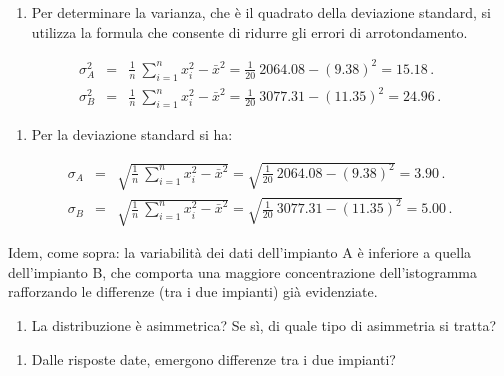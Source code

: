 \documentclass[
  11pt,
]{book}
\providecommand{\tightlist}{%
  \setlength{\itemsep}{0pt}\setlength{\parskip}{0pt}}
\theoremstyle{mytheoremstyle}
\theoremstyle{mydefstyle}
\newenvironment{sol}
  {
  \begin{tcolorbox}[enhanced,breakable,arc=0.1mm,boxrule=1pt,colback=white,colframe=iblue,
  title=\bf \fontfamily{lmss}\selectfont \hspace{.5 cm} Soluzione,drop fuzzy shadow]

}{
\end{tcolorbox}
  }
\begin{document}
\begin{sol}

\begin{enumerate}
\def\labelenumi{\alph{enumi}.}
\setcounter{enumi}{6}
\tightlist
\item
  Per determinare la varianza, che è il quadrato della deviazione
  standard, si utilizza la formula che consente di ridurre gli errori
  di arrotondamento.
\end{enumerate}

\begin{eqnarray*}
\sigma_{A}^{2} &=& \frac{1} {n}\ \sum_{i=1}^{n} x_{i}^{2} - \bar{x}^{2}
                =  \frac{1} {20}\ 2064.08 - (9.38)^{2} = 15.18 \,. \\
\sigma_{B}^{2} &=& \frac{1} {n}\ \sum_{i=1}^{n} x_{i}^{2} - \bar{x}^{2}
                =  \frac{1} {20}\ 3077.31 - (11.35)^{2} = 24.96 \,.
\end{eqnarray*}

\begin{enumerate}
\def\labelenumi{\alph{enumi}.}
\setcounter{enumi}{7}
\tightlist
\item
  Per la deviazione standard si ha:
\end{enumerate}

\begin{eqnarray*}
\sigma_{A} &=& \sqrt{ \frac{1} {n}\ \sum_{i=1}^{n} x_{i}^{2} - \bar{x}^{2} }
            =  \sqrt{ \frac{1} {20}\ 2064.08 - (9.38)^{2} } = 3.90 \,. \\
\sigma_{B} &=& \sqrt{ \frac{1} {n}\ \sum_{i=1}^{n} x_{i}^{2} - \bar{x}^{2} }
            =  \sqrt{ \frac{1} {20}\ 3077.31 - (11.35)^{2} } = 5.00 \,.
\end{eqnarray*}

Idem, come sopra: la variabilità dei dati dell'impianto A è
inferiore a quella dell'impianto B, che comporta una maggiore
concentrazione dell'istogramma rafforzando le differenze (tra i
due impianti) già evidenziate.

\end{sol}

\begin{enumerate}
\def\labelenumi{\roman{enumi}.}
\tightlist
\item
  La distribuzione è asimmetrica?
  Se sì, di quale tipo di asimmetria si tratta?
\end{enumerate}

\begin{enumerate}
\def\labelenumi{\alph{enumi}.}
\setcounter{enumi}{9}
\tightlist
\item
  Dalle risposte date, emergono differenze tra i due impianti?
\end{enumerate}
\end{document}
